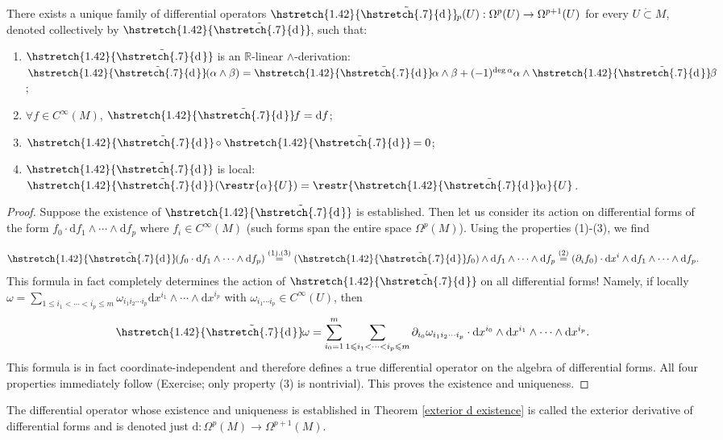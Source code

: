 \documentclass[english,letterpaper]{article}%
\numberwithin{equation}{section}
\numberwithin{figure}{section}
\numberwithin{table}{section}
\theoremstyle{definition}
\theoremstyle{definition}
\theoremstyle{definition}
\theoremstyle{plain}
\theoremstyle{plain}
\theoremstyle{plain}
\theoremstyle{plain}
\theoremstyle{remark}
\theoremstyle{remark}
\newcommand{\dd}{{\mathrm{d}}}
\renewcommand{\leq}{\leqslant}
\newcommand\wt[1]{\hstretch{1.42}{\tilde{\hstretch{.7}{#1\mkern2mu}}}\mkern-2mu}
\begin{document}
\begin{thm}\label{exterior d existence}
There exists a unique family of differential operators $\wt{\dd}_p(U):\Omega^p(U)\to \Omega^{p+1}(U)$ for every $U\mathring\subset M$, denoted collectively by $\wt\dd$, such that:
\begin{enumerate}
    \item $\wt\dd$ is an $\mathbb{R}$-linear $\wedge$-derivation: $\wt\dd(\alpha\wedge\beta)=\wt\dd\alpha\wedge\beta+(-1)^{\deg\alpha}\alpha\wedge\wt\dd\beta$;
    \item $\forall f\in C^\infty(M)$, $\wt\dd f=\dd f$;
    \item $\wt\dd\circ\wt\dd=0$;
    \item $\wt\dd$ is local: $\wt\dd\left(\restr{\alpha}{U}\right)=\restr{\wt\dd\alpha}{U}$.
\end{enumerate}
\end{thm}
\begin{proof}
Suppose the existence of $\wt\dd$ is established. Then let us consider its action on differential forms of the form $f_0\cdot \dd f_1\wedge \cdots \wedge \dd f_p$ where $f_i\in C^\infty(M)$ (such forms span the entire space $\Omega^p(M)$). Using the properties (1)-(3), we find

\[\wt\dd (f_0\cdot \dd f_1\wedge \cdots \wedge \dd f_p)\overset{(1),(3)}{=}(\wt\dd f_0) \wedge \dd f_1\wedge \cdots \wedge \dd f_p\overset{(2)}{=}(\partial_i f_0)\cdot \dd x^i\wedge \dd f_1\wedge \cdots \wedge \dd f_p.\]
This formula in fact completely determines the action of $\wt\dd$ on all differential forms! Namely, if locally $\omega=\sum_{1\leq i_1<\cdots <i_p\leq m}\omega_{i_1 i_2\cdots i_p}\dd x^{i_1}\wedge\cdots\wedge \dd x^{i_p}$ with $\omega_{i_1\cdots i_p}\in C^\infty(U)$, then
\[\wt\dd \omega =\sum_{i_0=1}^m\sum_{1\leq i_1<\cdots <i_p\leq m}\partial_{i_0}\omega_{i_1 i_2\cdots i_p}\cdot \dd x^{i_0}\wedge \dd x^{i_1}\wedge\cdots\wedge \dd x^{i_p}.\]
This formula is in fact coordinate-independent and therefore defines a true differential operator on the algebra of differential forms. All four properties immediately follow (Exercise; only property (3) is nontrivial). This proves the existence and uniqueness.
\end{proof}

\begin{defn}
The differential operator whose existence and uniqueness is established in Theorem \ref{exterior d existence} is called the exterior derivative of differential forms and is denoted just $\dd:\Omega^p(M)\to\Omega^{p+1}(M)$.
\end{defn}
\end{document}
